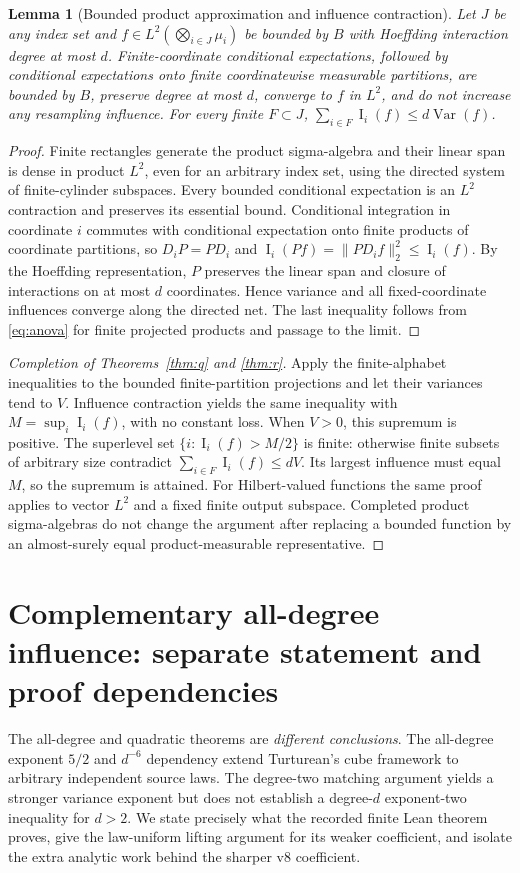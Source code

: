 \documentclass[11pt,letterpaper]{article}
\newtheorem{lemma}[theorem]{Lemma}
\theoremstyle{definition}\newtheorem{definition}[theorem]{Definition}
\newcommand{\Var}{\operatorname{Var}}
\newcommand{\Inf}{\operatorname{I}}
\newcommand{\norm}[1]{\lVert #1\rVert}
\begin{document}
\begin{lemma}[Bounded product approximation and influence contraction]\label{lem:lift}
Let $J$ be any index set and $f\in L^2(\bigotimes_{i\in J}\mu_i)$ be bounded by $B$ with Hoeffding interaction degree at most $d$. Finite-coordinate conditional expectations, followed by conditional expectations onto finite coordinatewise measurable partitions, are bounded by $B$, preserve degree at most $d$, converge to $f$ in $L^2$, and do not increase any resampling influence. For every finite $F\subset J$, $\sum_{i\in F}\Inf_i(f)\le d\Var(f)$.
\end{lemma}
\begin{proof}
Finite rectangles generate the product sigma-algebra and their linear span is dense in product $L^2$, even for an arbitrary index set, using the directed system of finite-cylinder subspaces. Every bounded conditional expectation is an $L^2$ contraction and preserves its essential bound. Conditional integration in coordinate $i$ commutes with conditional expectation onto finite products of coordinate partitions, so $D_i P=PD_i$ and $\Inf_i(Pf)=\norm{PD_if}_2^2\le\Inf_i(f)$. By the Hoeffding representation, $P$ preserves the linear span and closure of interactions on at most $d$ coordinates. Hence variance and all fixed-coordinate influences converge along the directed net. The last inequality follows from \eqref{eq:anova} for finite projected products and passage to the limit.
\end{proof}
\begin{proof}[Completion of Theorems~\ref{thm:q} and \ref{thm:r}]
Apply the finite-alphabet inequalities to the bounded finite-partition projections and let their variances tend to $V$. Influence contraction yields the same inequality with $M=\sup_i\Inf_i(f)$, with no constant loss. When $V>0$, this supremum is positive. The superlevel set $\{i:\Inf_i(f)>M/2\}$ is finite: otherwise finite subsets of arbitrary size contradict $\sum_{i\in F}\Inf_i(f)\le dV$. Its largest influence must equal $M$, so the supremum is attained. For Hilbert-valued functions the same proof applies to vector $L^2$ and a fixed finite output subspace. Completed product sigma-algebras do not change the argument after replacing a bounded function by an almost-surely equal product-measurable representative.
\end{proof}

\section{Complementary all-degree influence: separate statement and proof dependencies}\label{sec:alldeg}
The all-degree and quadratic theorems are \emph{different conclusions}. The all-degree exponent $5/2$ and $d^{-6}$ dependency extend Turturean's cube framework to arbitrary independent source laws. The degree-two matching argument yields a stronger variance exponent but does not establish a degree-$d$ exponent-two inequality for $d>2$. We state precisely what the recorded finite Lean theorem proves, give the law-uniform lifting argument for its weaker coefficient, and isolate the extra analytic work behind the sharper v8 coefficient.
\end{document}
